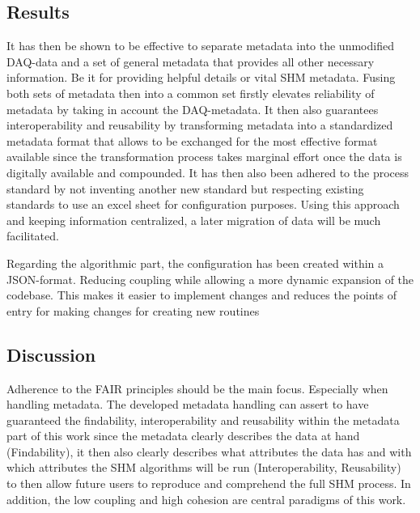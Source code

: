 \subsection{Results}




It has then be shown to be effective to separate metadata into the unmodified DAQ-data and a set of general metadata that provides all other necessary information. Be it for providing helpful details or vital SHM metadata. Fusing both sets of metadata then into a common set firstly elevates reliability of metadata by taking in account the DAQ-metadata. It then also guarantees interoperability and reusability by transforming metadata into a standardized metadata format that allows to be exchanged for the most effective format available since the transformation process takes marginal effort once the data is digitally available and compounded.
It has then also been adhered to the process standard by not inventing another new standard but respecting existing standards to use an excel sheet for configuration purposes. Using this approach and keeping information centralized, a later migration of data will be much facilitated.

Regarding the algorithmic part, the configuration has been created within a JSON-format. Reducing coupling while allowing a more dynamic expansion of the codebase. This makes it easier to implement changes and reduces the points of entry for making changes for creating new routines


\subsection{Discussion}

Adherence to the FAIR principles should be the main focus. Especially when handling metadata. The developed metadata handling can assert to have guaranteed the findability, interoperability and reusability within the metadata part of this work since the metadata clearly describes the data at hand (Findability), it then also clearly describes what attributes the data has and with which attributes the SHM algorithms will be run (Interoperability, Reusability) to then allow future users to reproduce and comprehend the full SHM process. In addition, the low coupling and high cohesion are central paradigms of this work.

